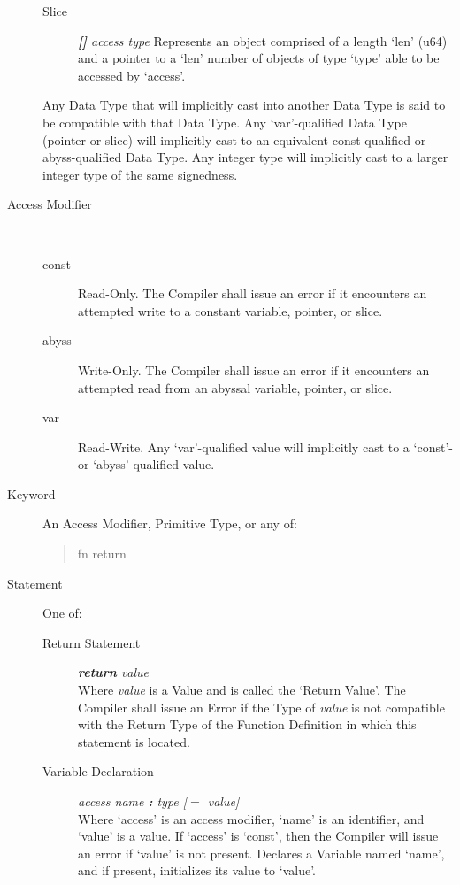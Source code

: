\documentclass{article}
\begin{document}
\begin{description}
\begin{description}
		\item[Slice] \textit{\textbf{[]} access type}
			Represents an object comprised of a length `len' (u64) and a pointer to a `len' number of objects of type `type' able to be accessed by `access'.

		\end{description}
			Any Data Type that will implicitly cast into another Data Type is said to be compatible with that Data Type.
			Any `var'-qualified Data Type (pointer or slice) will implicitly cast to an equivalent const-qualified or abyss-qualified Data Type. 
			Any integer type will implicitly cast to a larger integer type of the same signedness.
	\item[Access Modifier] \hfill \\
		\begin{description}
		\item[const] Read-Only. The Compiler shall issue an error if it encounters an attempted write to a constant variable, pointer, or slice.
		\item[abyss] Write-Only. The Compiler shall issue an error if it encounters an attempted read from an abyssal variable, pointer, or slice.
		\item[var] Read-Write. Any `var'-qualified value will implicitly cast to a `const'- or `abyss'-qualified value.
		\end{description}

	\item[Keyword] An Access Modifier, Primitive Type, or any of:
		\begin{quote}
		fn return
		\end{quote}

	\item[Statement] One of:
		\begin{description}
		\item[Return Statement] \hfill \textit{\textbf{return} value} \\
			Where \textit{value} is a Value and is called the `Return Value'.
			The Compiler shall issue an Error if the Type of \textit{value} is not compatible with the Return Type of the Function Definition in which this statement is located.

		\item[Variable Declaration] \hfill \textit{access name \textbf : type [$=$ value]} \\
			Where `access' is an access modifier, `name' is an identifier, and `value' is a value.
			If `access' is `const', then the Compiler will issue an error if `value' is not present.
			Declares a Variable named `name', and if present, initializes its value to `value'.


\end{description}
\end{description}
\end{document}
